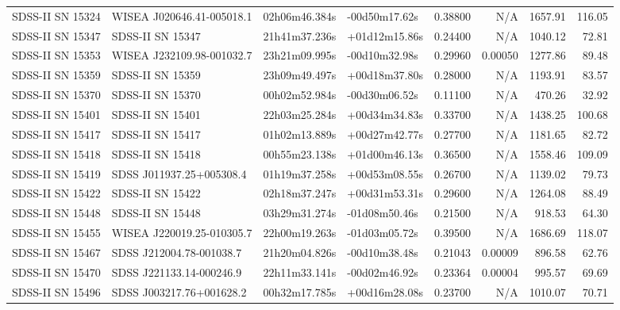 \begin{longtable}{llllrrrr}
SDSS-II SN 15324 &       WISEA J020646.41-005018.1 &   02h06m46.384s &   -00d50m17.62s &  0.38800 &      N/A &  1657.91 &      116.05 \\
SDSS-II SN 15347 &                SDSS-II SN 15347 &   21h41m37.236s &   +01d12m15.86s &  0.24400 &      N/A &  1040.12 &       72.81 \\
SDSS-II SN 15353 &       WISEA J232109.98-001032.7 &   23h21m09.995s &   -00d10m32.98s &  0.29960 &  0.00050 &  1277.86 &       89.48 \\
SDSS-II SN 15359 &                SDSS-II SN 15359 &   23h09m49.497s &   +00d18m37.80s &  0.28000 &      N/A &  1193.91 &       83.57 \\
SDSS-II SN 15370 &                SDSS-II SN 15370 &   00h02m52.984s &   -00d30m06.52s &  0.11100 &      N/A &   470.26 &       32.92 \\
SDSS-II SN 15401 &                SDSS-II SN 15401 &   22h03m25.284s &   +00d34m34.83s &  0.33700 &      N/A &  1438.25 &      100.68 \\
SDSS-II SN 15417 &                SDSS-II SN 15417 &   01h02m13.889s &   +00d27m42.77s &  0.27700 &      N/A &  1181.65 &       82.72 \\
SDSS-II SN 15418 &                SDSS-II SN 15418 &   00h55m23.138s &   +01d00m46.13s &  0.36500 &      N/A &  1558.46 &      109.09 \\
SDSS-II SN 15419 &        SDSS J011937.25+005308.4 &   01h19m37.258s &   +00d53m08.55s &  0.26700 &      N/A &  1139.02 &       79.73 \\
SDSS-II SN 15422 &                SDSS-II SN 15422 &   02h18m37.247s &   +00d31m53.31s &  0.29600 &      N/A &  1264.08 &       88.49 \\
SDSS-II SN 15448 &                SDSS-II SN 15448 &   03h29m31.274s &   -01d08m50.46s &  0.21500 &      N/A &   918.53 &       64.30 \\
SDSS-II SN 15455 &       WISEA J220019.25-010305.7 &   22h00m19.263s &   -01d03m05.72s &  0.39500 &      N/A &  1686.69 &      118.07 \\
SDSS-II SN 15467 &        SDSS J212004.78-001038.7 &   21h20m04.826s &   -00d10m38.48s &  0.21043 &  0.00009 &   896.58 &       62.76 \\
SDSS-II SN 15470 &        SDSS J221133.14-000246.9 &   22h11m33.141s &   -00d02m46.92s &  0.23364 &  0.00004 &   995.57 &       69.69 \\
SDSS-II SN 15496 &        SDSS J003217.76+001628.2 &   00h32m17.785s &   +00d16m28.08s &  0.23700 &      N/A &  1010.07 &       70.71 \\

\end{longtable}
